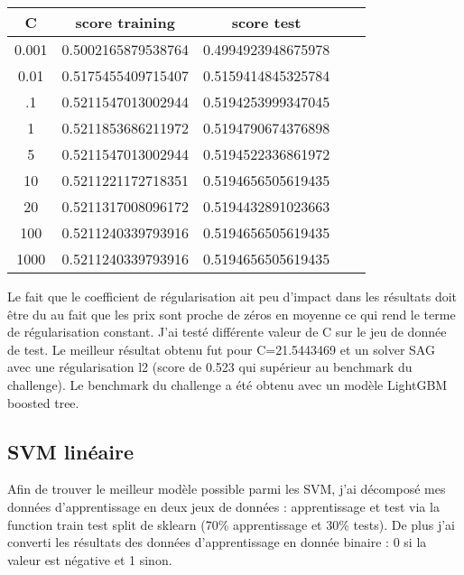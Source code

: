 \documentclass[12pt]{scrartcl} %
\begin{document}
\begin{table}[h!]
\centering
\begin{adjustbox}{max width=\textwidth}
\begin{tabular}{|c|c|c|c|c|}
 C &score training & score test\\
\hline
 0.001 & 0.5002165879538764& 0.4994923948675978 \\
0.01 &  0.5175455409715407& 0.5159414845325784 \\
.1 & 0.5211547013002944& 0.5194253999347045 \\
1 & 0.5211853686211972& 0.5194790674376898 \\
5 &  0.5211547013002944& 0.5194522336861972 \\
10 & 0.5211221172718351& 0.5194656505619435 \\
20 & 0.5211317008096172& 0.5194432891023663 \\
100 & 0.5211240339793916& 0.5194656505619435 \\
1000 & 0.5211240339793916& 0.5194656505619435
\end{tabular}
\end{adjustbox}
\end{table}
Le fait que le coefficient de régularisation ait peu d'impact dans les résultats doit être du au fait que les prix sont proche de zéros en moyenne ce qui rend le terme de régularisation constant.
J'ai testé différente valeur de C sur le jeu de donnée de test. Le meilleur résultat obtenu fut pour C=21.5443469 et un solver SAG avec une régularisation l2 (score de 0.523 qui supérieur au benchmark du challenge). Le benchmark du challenge a été obtenu avec un modèle LightGBM boosted tree.
\subsection{SVM linéaire}
Afin de trouver le meilleur modèle possible parmi les SVM, j'ai décomposé mes données d'apprentissage en deux jeux de données : apprentissage et test via la function train test split de sklearn (70\% apprentissage et 30\% tests). De plus j'ai converti les résultats des données d'apprentissage en donnée binaire : 0 si la valeur est négative et 1 sinon.
\end{document}
